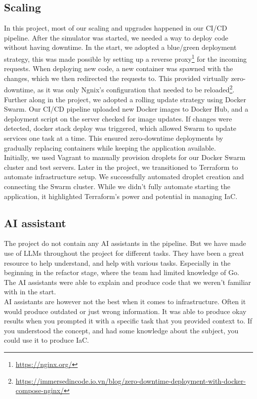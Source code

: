 \subsection{Scaling}
In this project, most of our scaling and upgrades happened in our CI/CD pipeline. After the simulator was started, we needed a way to deploy code without having downtime. In the start, we adopted a blue/green deployment strategy, this was made possible by setting up a reverse proxy\footnote{\url{https://nginx.org/}} for the incoming requests. When deploying new code, a new container was spawned with the changes, which we then redirected the requests to. This provided virtually zero-downtime, as it was only Ngnix's configuration that needed to be reloaded\footnote{\url{https://immersedincode.io.vn/blog/zero-downtime-deployment-with-docker-compose-nginx/}}.
\\

Further along in the project, we adopted a rolling update strategy using Docker Swarm. Our CI/CD pipeline uploaded new Docker images to Docker Hub, and a deployment script on the server checked for image updates. If changes were detected, docker stack deploy was triggered, which allowed Swarm to update services one task at a time. This ensured zero-downtime deployments by gradually replacing containers while keeping the application available.
\\

Initially, we used Vagrant to manually provision droplets for our Docker Swarm cluster and test servers. Later in the project, we transitioned to Terraform to automate infrastructure setup. We successfully automated droplet creation and connecting the Swarm cluster. While we didn’t fully automate starting the application, it highlighted Terraform’s power and potential in managing IaC.

\subsection{AI assistant} 

The project do not contain any AI assistants in the pipeline. But we have made use of LLMs throughout the project for different tasks. They have been a great resource to help understand, and help with various tasks. Especially in the beginning in the refactor stage, where the team had limited knowledge of Go. The AI assistants were able to explain and produce code that we weren't familiar with in the start.
\\
AI assistants are however not the best when it comes to infrastructure. Often it would produce outdated or just wrong information. It was able to produce okay results when you prompted it with a specific task that you provided context to. If you understood the concept, and had some knowledge about the subject, you could use it to produce IaC. 
